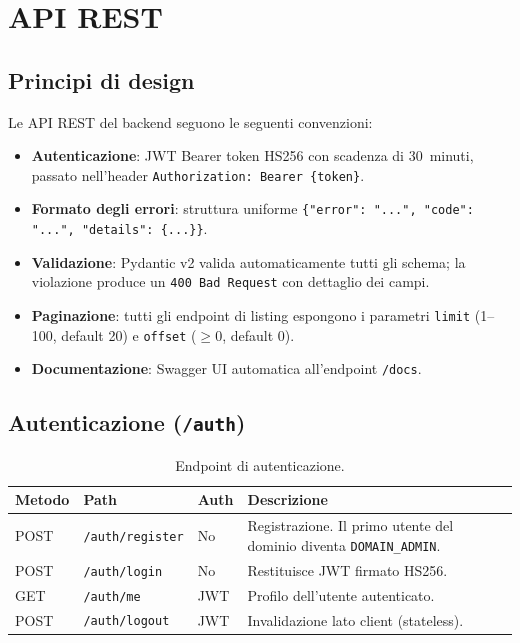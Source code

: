 \chapter{API REST}
\label{chap:api}

\section{Principi di design}
\label{sec:api_design}

Le API REST del backend seguono le seguenti convenzioni:

\begin{itemize}[leftmargin=*]
    \item \textbf{Autenticazione}: JWT Bearer token HS256 con scadenza di 30~minuti,
          passato nell'header \texttt{Authorization: Bearer \{token\}}.
    \item \textbf{Formato degli errori}: struttura uniforme
          \texttt{\{"error": "...", "code": "...", "details": \{...\}\}}.
    \item \textbf{Validazione}: Pydantic v2 valida automaticamente tutti gli schema;
          la violazione produce un \texttt{400 Bad Request} con dettaglio dei campi.
    \item \textbf{Paginazione}: tutti gli endpoint di listing espongono i parametri
          \texttt{limit} (1--100, default 20) e \texttt{offset} ($\geq 0$, default 0).
    \item \textbf{Documentazione}: Swagger UI automatica all'endpoint \texttt{/docs}.
\end{itemize}

\section{Autenticazione (\texttt{/auth})}
\label{sec:api_auth}

\begin{table}[ht]
\centering
\small
\begin{tabularx}{\linewidth}{l l l X}
\toprule
\textbf{Metodo} & \textbf{Path} & \textbf{Auth} & \textbf{Descrizione} \\
\midrule
POST & \texttt{/auth/register} & No  & Registrazione. Il primo utente del dominio diventa \texttt{DOMAIN\_ADMIN}. \\
POST & \texttt{/auth/login}    & No  & Restituisce JWT firmato HS256. \\
GET  & \texttt{/auth/me}       & JWT & Profilo dell'utente autenticato. \\
POST & \texttt{/auth/logout}   & JWT & Invalidazione lato client (stateless). \\
\bottomrule
\end{tabularx}
\caption{Endpoint di autenticazione.}
\end{table}

